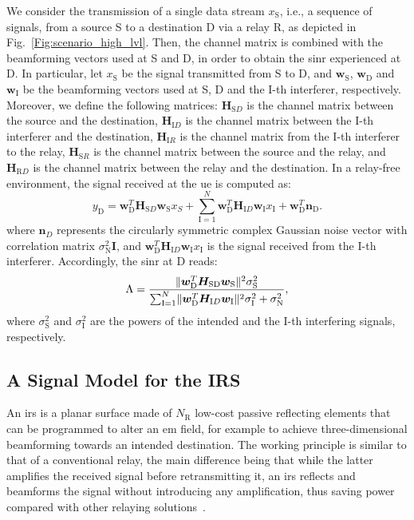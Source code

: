 We consider the transmission of a single data stream $x_{\mathrm S}$, i.e., a sequence of signals, from a source S to a destination D via a relay R, as depicted in Fig.~\ref{Fig:scenario_high_lvl}. 
Then, the channel matrix is combined with the beamforming vectors used at S and D, in order to obtain the \gls{sinr} experienced at D. 
In particular, let $x_{\mathrm S}$ be the signal transmitted from S to D, and $\bm{w}_{\mathrm S}$, $\bm{w}_{\mathrm D}$ and $\bm{w}_{\mathrm I}$ be the beamforming vectors used at S, D and the I-th interferer, respectively. Moreover, we define the following matrices:
$\bm{H}_{\mathrm SD}$ is the channel matrix between the source and the destination,
 $\bm{H}_{\mathrm ID}$ is the channel matrix between the \mbox{I-th} interferer and the destination,
 $\bm{H}_{\mathrm IR}$ is the channel matrix from the \mbox{I-th} interferer to the relay,
 $\bm{H}_{\mathrm SR}$ is the channel matrix between the source and the relay,
 and $\bm{H}_{\mathrm RD}$ is the channel matrix between the relay and the destination.
In a relay-free environment, the signal received at the \gls{ue} is computed as:
\begin{equation}
    \label{eq:input_output_nodev}
    y_{\mathrm D} = \bm{w}_{\mathrm D}^{T} \bm{H}_{\mathrm SD} \bm{w}_{\mathrm S} x_{S} + \sum_{\mathrm{I}=1}^{N} \bm{w}_{\mathrm D}^{T} \bm{H}_{\mathrm ID}  \bm{w}_{\mathrm I} x_{\mathrm I} + \bm{w}_{\mathrm D}^{T} \bm{n}_{\mathrm D}.
\end{equation}
where $\bm{n}_D$ represents the circularly symmetric complex Gaussian noise vector with correlation matrix $\sigma_{\mathrm N}^2 \bm{I} $, and $\bm{w}_{\mathrm D}^{T} \bm{H}_{\mathrm ID} \bm{w}_{\mathrm I} x_{\mathrm I}$ is the signal received from the $\mathrm I$-th interferer.
Accordingly, the \gls{sinr} at D reads:
\begin{equation}
	\Lambda = \frac{ \lVert \bm{w}_{ \textrm D}^{T} \bm{H}_{\textrm {SD}}\bm{w}_{ \textrm S} \rVert^2 \sigma_{\mathrm S}^2 } { \sum_{\mathrm{I}=1}^{N} \lVert \bm{w}_{\mathrm D}^{T} \bm{H}_{\mathrm ID} \bm{w}_{\mathrm I} \rVert^2 \sigma_{\mathrm I}^2 + \sigma_{\mathrm N}^2 },
\end{equation}
where $\sigma_{\mathrm S}^2$ and $\sigma_{\mathrm I}^2$ are the powers of the intended and the $\mathrm{I}$-th interfering signals, respectively.
\subsection{A Signal Model for the IRS}
\label{sec:irs_phy_model} 
An \gls{irs} is a planar surface made of $N_{\mathrm R}$ low-cost passive reflecting elements that can be programmed to alter an \gls{em} field, for example to achieve three-dimensional beamforming towards an intended destination.
The working principle is similar to that of a conventional relay, the main difference being that while the latter amplifies the received signal before retransmitting it, an \gls{irs} reflects and beamforms the signal without introducing any amplification, thus saving power compared with other relaying solutions~\cite{bjornson2019intelligent}. %


